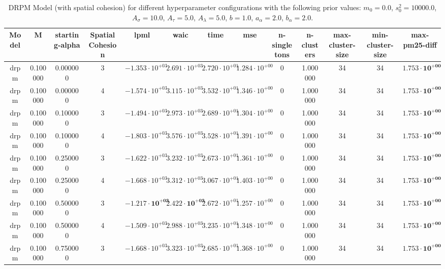 \begin{table}
\caption{DRPM Model (with spatial cohesion) for different hyperparameter configurations with the following prior values:  $m_0 = 0.0$, $s_0^2 = 10000.0$, $A_\sigma = 10.0$, $A_\tau = 5.0$, $A_\lambda = 5.0$, $b = 1.0$, $a_\alpha = 2.0$, $b_\alpha = 2.0$.}
\centering
\begin{tabular}{ccccccccccccc}
\toprule
Model & M & starting-alpha & SpatialCohesion & lpml & waic & time & mse & n-singletons & n-clusters & max-cluster-size & min-cluster-size & max-pm25-diff \\
\midrule
drpm & 0.100000 & 0.000000 & 3 & $-1.353 \cdot 10^{+03}$ & $2.691 \cdot 10^{+03}$ & $2.720 \cdot 10^{+01}$ & $1.284 \cdot 10^{+00}$ & 0 & 1.000000 & 34 & 34 & $\mathbf{1.753 \cdot 10^{+00}}$ \\
drpm & 0.100000 & 0.000000 & 4 & $-1.574 \cdot 10^{+03}$ & $3.115 \cdot 10^{+03}$ & $3.532 \cdot 10^{+01}$ & $1.346 \cdot 10^{+00}$ & 0 & 1.000000 & 34 & 34 & $\mathbf{1.753 \cdot 10^{+00}}$ \\
drpm & 0.100000 & 0.100000 & 3 & $-1.494 \cdot 10^{+03}$ & $2.973 \cdot 10^{+03}$ & $2.689 \cdot 10^{+01}$ & $1.304 \cdot 10^{+00}$ & 0 & 1.000000 & 34 & 34 & $\mathbf{1.753 \cdot 10^{+00}}$ \\
drpm & 0.100000 & 0.100000 & 4 & $-1.803 \cdot 10^{+03}$ & $3.576 \cdot 10^{+03}$ & $3.528 \cdot 10^{+01}$ & $1.391 \cdot 10^{+00}$ & 0 & 1.000000 & 34 & 34 & $\mathbf{1.753 \cdot 10^{+00}}$ \\
drpm & 0.100000 & 0.250000 & 3 & $-1.622 \cdot 10^{+03}$ & $3.232 \cdot 10^{+03}$ & $2.673 \cdot 10^{+01}$ & $1.361 \cdot 10^{+00}$ & 0 & 1.000000 & 34 & 34 & $\mathbf{1.753 \cdot 10^{+00}}$ \\
drpm & 0.100000 & 0.250000 & 4 & $-1.668 \cdot 10^{+03}$ & $3.312 \cdot 10^{+03}$ & $3.067 \cdot 10^{+01}$ & $1.403 \cdot 10^{+00}$ & 0 & 1.000000 & 34 & 34 & $\mathbf{1.753 \cdot 10^{+00}}$ \\
drpm & 0.100000 & 0.500000 & 3 & $\mathbf{-1.217 \cdot 10^{+03}}$ & $\mathbf{2.422 \cdot 10^{+03}}$ & $2.672 \cdot 10^{+01}$ & $1.257 \cdot 10^{+00}$ & 0 & 1.000000 & 34 & 34 & $\mathbf{1.753 \cdot 10^{+00}}$ \\
drpm & 0.100000 & 0.500000 & 4 & $-1.509 \cdot 10^{+03}$ & $2.988 \cdot 10^{+03}$ & $3.235 \cdot 10^{+01}$ & $1.348 \cdot 10^{+00}$ & 0 & 1.000000 & 34 & 34 & $\mathbf{1.753 \cdot 10^{+00}}$ \\
drpm & 0.100000 & 0.750000 & 3 & $-1.668 \cdot 10^{+03}$ & $3.323 \cdot 10^{+03}$ & $2.685 \cdot 10^{+01}$ & $1.368 \cdot 10^{+00}$ & 0 & 1.000000 & 34 & 34 & $\mathbf{1.753 \cdot 10^{+00}}$ \\

\end{tabular}
\end{table}
